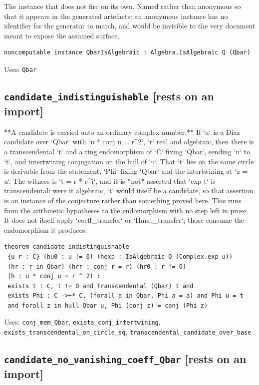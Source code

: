 \documentclass[11pt,a4paper]{article}
\newcommand{\tagon}{\textcolor{onaxc}{\textbf{[rests on an import]}}}
\begin{document}
The instance that does not fire on its own. Named rather than anonymous so that it appears in the generated artefacts: an anonymous instance has no identifier for the generator to match, and would be invisible to the very document meant to expose the assumed surface.

\begin{lstlisting}
noncomputable instance QbarIsAlgebraic : Algebra.IsAlgebraic Q (Qbar)
\end{lstlisting}
\noindent\footnotesize Uses: \texttt{Qbar}\normalsize


\subsection*{\texttt{candidate\_indistinguishable} \hfill \tagon}

**A candidate is carried onto an ordinary complex number.** If `u` is a Diaz candidate over `Qbar` with `u * conj u = r\^{}2`, `r` real and algebraic, then there is a transcendental `t` and a ring endomorphism of `C` fixing `Qbar`, sending `u` to `t`, and intertwining conjugation on the hull of `u`. That `t` lies on the same circle is derivable from the statement, `Phi` fixing `Qbar` and the intertwining at `z = u`. The witness is `t = r * e\^{}i`, and it is *not* asserted that `exp t` is transcendental: were it algebraic, `t` would itself be a candidate, so that assertion is an instance of the conjecture rather than something proved here. This runs from the arithmetic hypotheses to the endomorphism with no step left in prose. It does not itself apply `coeff\_transfer` or `Hmat\_transfer`; those consume the endomorphism it produces.

\begin{lstlisting}
theorem candidate_indistinguishable
 {u r : C} (hu0 : u != 0) (hexp : IsAlgebraic Q (Complex.exp u))
 (hr : r in Qbar) (hrr : conj r = r) (hr0 : r != 0)
 (h : u * conj u = r ^ 2) :
 exists t : C, t != 0 and Transcendental (Qbar) t and 
 exists Phi : C ->+* C, (forall a in Qbar, Phi a = a) and Phi u = t
 and forall z in hull Qbar u, Phi (conj z) = conj (Phi z)
\end{lstlisting}
\noindent\footnotesize Uses: \texttt{conj\_mem\_Qbar}, \texttt{exists\_conj\_intertwining}, \texttt{exists\_transcendental\_on\_circle\_sq}, \texttt{transcendental\_candidate\_over\_base}\normalsize


\subsection*{\texttt{candidate\_no\_vanishing\_coeff\_Qbar} \hfill \tagon}
\end{document}
